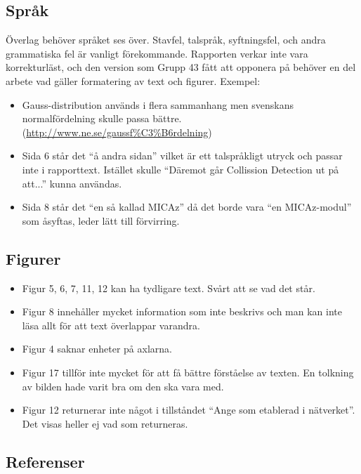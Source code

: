 \documentclass[a4paper,11pt]{article}
\begin{document}
\subsection{Språk}

Överlag behöver språket ses över. Stavfel, talspråk, syftningsfel, och andra grammatiska fel är vanligt förekommande. Rapporten verkar inte vara korrekturläst, och den version som Grupp 43 fått att opponera på behöver en del arbete vad gäller formatering av text och figurer. Exempel:

\begin{itemize}
   \item Gauss-distribution används i flera sammanhang men svenskans normalfördelning skulle passa bättre. (\url{http://www.ne.se/gaussf\%C3\%B6rdelning})
   \item Sida 6 står det “å andra sidan” vilket är ett talspråkligt utryck och passar inte i rapporttext. Istället skulle “Däremot går Collission Detection ut på att...” kunna användas.
   \item Sida 8 står det “en så kallad MICAz” då det borde vara “en MICAz-modul” som åsyftas, leder lätt till förvirring.
\end{itemize}

\subsection{Figurer}

\begin{itemize}
   \item Figur 5, 6, 7, 11, 12 kan ha tydligare text. Svårt att se vad det står.
   \item Figur 8 innehåller mycket information som inte beskrivs och man kan inte läsa allt för att text överlappar varandra.
   \item Figur 4 saknar enheter på axlarna.
   \item Figur 17 tillför inte mycket för att få bättre förståelse av texten. En tolkning av bilden hade varit bra om den ska vara med.
   \item Figur 12 returnerar inte något i tillståndet “Ange som etablerad i nätverket”. Det visas heller ej vad som returneras.
\end{itemize}

\subsection{Referenser}
\end{document}
